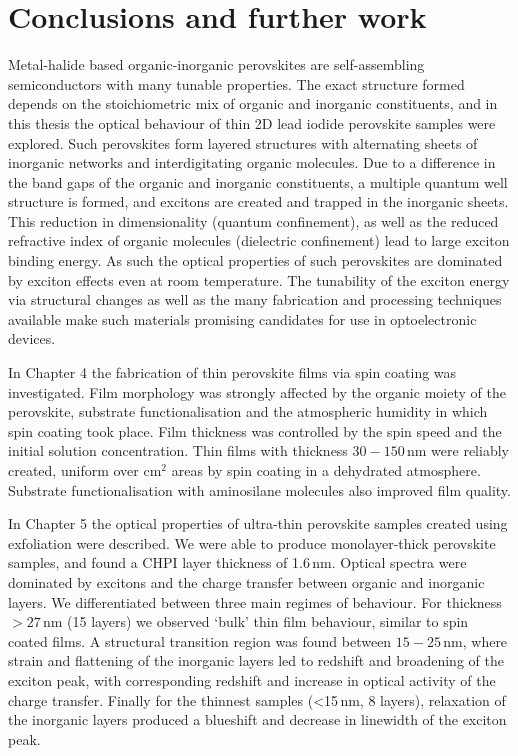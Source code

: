 
\chapter{Conclusions and further work}

\graphicspath{{Chapter8/Figures/}}

Metal-halide based organic-inorganic perovskites are self-assembling semiconductors with many tunable properties. The exact structure formed depends on the stoichiometric mix of organic and inorganic constituents, and in this thesis the optical behaviour of thin 2D lead iodide perovskite samples were explored. Such perovskites form layered structures with alternating sheets of inorganic  networks and interdigitating organic molecules. Due to a difference in the band gaps of the organic and inorganic constituents, a multiple quantum well structure is formed, and excitons are created and trapped in the inorganic sheets. This reduction in dimensionality (quantum confinement), as well as the reduced refractive index of organic molecules (dielectric confinement) lead to large exciton binding energy. As such the optical properties of such perovskites are dominated by exciton effects even at room temperature. The tunability of the exciton energy via structural changes as well as the many fabrication and processing techniques available make such materials promising candidates for use in optoelectronic devices.

In Chapter 4 the fabrication of thin perovskite films via spin coating was investigated. Film morphology was strongly affected by the organic moiety of the perovskite, substrate functionalisation and the atmospheric humidity in which spin coating took place. Film thickness was controlled by the spin speed and the initial solution concentration. Thin films with thickness $30-150$\,nm were reliably created, uniform over cm$^2$ areas by spin coating in a dehydrated atmosphere. Substrate functionalisation with aminosilane molecules also improved film quality.

In Chapter 5 the optical properties of ultra-thin perovskite samples created using exfoliation were described. We were able to produce monolayer-thick perovskite samples, and found a CHPI layer thickness of 1.6\,nm. Optical spectra were dominated by excitons and the charge transfer between organic and inorganic layers. We differentiated between three main regimes of behaviour. For thickness $>27$\,nm (15 layers) we observed `bulk' thin film behaviour, similar to spin coated films. A structural transition region was found between $15-25$\,nm, where strain and flattening of the inorganic layers led to redshift and broadening of the exciton peak, with corresponding redshift and increase in optical activity of the charge transfer. Finally for the thinnest samples (<15\,nm, 8 layers), relaxation of the inorganic layers produced a blueshift and decrease in linewidth of the exciton peak.

